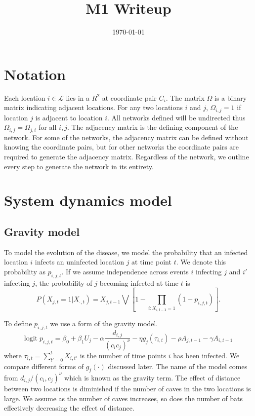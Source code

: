 \documentclass[11pt]{article}
\date{\today}
\title{M1 Writeup}
\newcommand{\logit}{\text{logit}}
\begin{document}
\maketitle
\tableofcontents


\section{Notation}
\label{sec-1}

Each location $i \in \mathcal{L}$ lies in a $R^2$ at coordinate pair
$C_i$.  The matrix $\Omega$ is a binary matrix indicating adjacent
locations.  For any two locations $i$ and $j$, $\Omega_{i,j} = 1$ if
location $j$ is adjacent to location $i$.  All networks defined will
be undirected thus $\Omega_{i,j} = \Omega_{j,i}$ for all $i,j$.  The
adjacency matrix is the defining component of the network.  For some
of the networks, the adjacency matrix can be defined without knowing
the coordinate pairs, but for other networks the coordinate pairs are
required to generate the adjacency matrix.  Regardless of the network,
we outline every step to generate the network in its entirety.


\section{System dynamics model}
\label{sec-2}

\subsection{Gravity model}
\label{sec-2-1}

To model the evolution of the disease, we model the probability that
an infected location $i$ infects an uninfected location $j$ at time
point $t$.  We denote this probability as $p_{i,j,t}$.  If we assume
independence across events $i$ infecting $j$ and $i'$ infecting $j$,
the probability of $j$ becoming infected at time $t$ is
\begin{equation*}
  P(X_{j,t} = 1 | X_{\cdot,t}) = X_{j,t-1} \bigvee \left[1 - \prod_{i:
  X_{i,t-1} = 1} ( 1 - p_{i,j,t} ) \right].
\end{equation*}

To define $p_{i,j,t}$ we use a form of the gravity model.
\begin{equation*}
  \logit \; p_{i,j,t} = \beta_0 + \beta_1 U_j 
  - \alpha \frac{d_{i,j}}{(c_ic_j)^\nu} - \eta g_j(\tau_{i,t})
  - \rho A_{j,t-1} - \gamma A_{i,t-1}
\end{equation*}
where $\tau_{i,t} = \sum_{t' = 0}^t X_{i,t'}$ is the number of time
points $i$ has been infected.  We compare different forms of
$g_j(\cdot)$ discussed later.  The name of the model comes from
$d_{i,j}/(c_i,c_j)^\nu$ which is known as the gravity term.  The
effect of distance between two locations is diminished if the number
of caves in the two locations is large.  We assume as the number of
caves increases, so does the number of bats effectively decreasing the
effect of distance.
\end{document}
